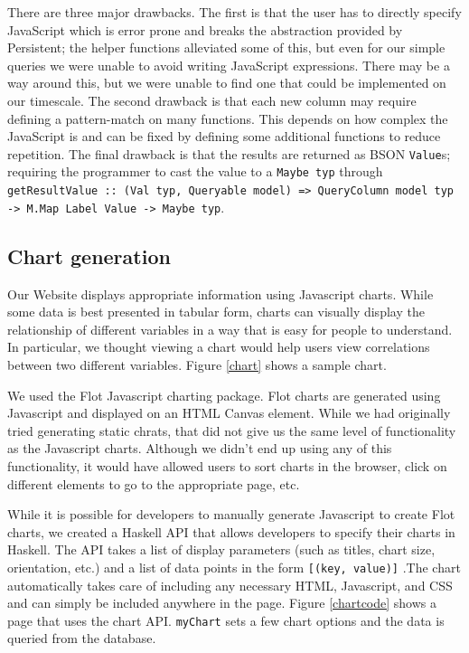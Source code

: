 \documentclass{chi2009}
\newcommand{\code}[1]{\texttt{#1}}
\begin{document}
There are three major drawbacks.  The first is that the user has to directly specify JavaScript which is error prone and breaks the abstraction provided by Persistent; the helper functions alleviated some of this, but even for our simple queries we were unable to avoid writing JavaScript expressions.  There may be a way around this, but we were unable to find one that could be implemented on our timescale.  The second drawback is that each new column may require defining a pattern-match on many functions.  This depends on how complex the JavaScript is and can be fixed by defining some additional functions to reduce repetition.  The final drawback is that the results are returned as BSON \code{Value}s; requiring the programmer to cast the value to a \code{Maybe typ} through \code{getResultValue :: (Val typ, Queryable model) => QueryColumn model typ -> M.Map Label Value -> Maybe typ}.

\subsection{Chart generation}

Our Website displays appropriate information using Javascript charts. While some data is best presented in tabular form, charts can visually display the relationship of different variables in a way that is easy for people to understand. In particular, we thought viewing a chart would help users view correlations between two different variables. Figure \ref{chart} shows a sample chart.

We used the Flot Javascript charting package. Flot charts are generated using Javascript and displayed on an HTML Canvas element. While we had originally tried generating static chrats, that did not give us the same level of functionality as the Javascript charts. Although we didn't end up using any of this functionality, it would have allowed users to sort charts in the browser, click on different elements to go to the appropriate page, etc. 

While it is possible for developers to manually generate Javascript to create Flot charts, we created a Haskell API that allows developers to specify their charts in Haskell. The API takes a list of display parameters (such as titles, chart size, orientation, etc.) and a list of data points in the form \code{[(key, value)]} .The chart automatically takes care of including any necessary HTML, Javascript, and CSS and can simply be included anywhere in the page. Figure \ref{chartcode} shows a page that uses the chart API. \code{myChart} sets a few chart options and the data is queried from the database. 
\end{document}
